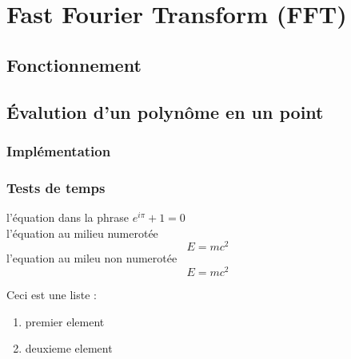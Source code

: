 \documentclass[12pt, a4paper]{article}
\begin{document}
\section{Fast Fourier Transform (FFT)}
\subsection{Fonctionnement}
\subsection{Évalution d'un polynôme en un point}
\subsubsection{Implémentation}
\subsubsection{Tests de temps}

l'équation dans la phrase $e^{i\pi}+1 = 0$\\
l'équation au milieu numerotée
\begin{equation}
E=mc^2
\end{equation}
l'equation au mileu non numerotée
\[ E=mc^2 \]

Ceci est une liste :
\begin{enumerate}
  \item premier element
  \item deuxieme element
\end{enumerate}
\end{document}
